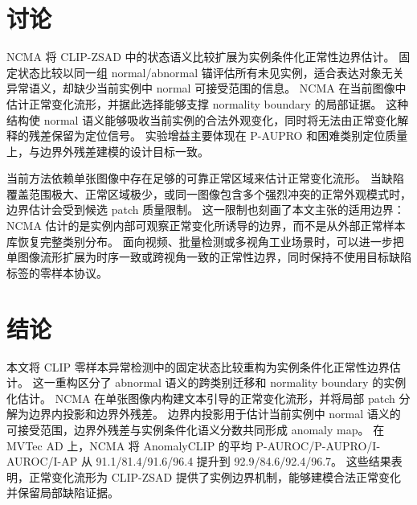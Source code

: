 \documentclass[UTF8,11pt,a4paper,fontset=none]{ctexart}
\newcommand{\method}{NCMA}
\begin{document}
\section{讨论}
\label{sec:discussion}

\method{} 将 CLIP-ZSAD 中的状态语义比较扩展为实例条件化正常性边界估计。
固定状态比较以同一组 normal/abnormal 锚评估所有未见实例，适合表达对象无关异常语义，却缺少当前实例中 normal 可接受范围的信息。
\method{} 在当前图像中估计正常变化流形，并据此选择能够支撑 normality boundary 的局部证据。
这种结构使 normal 语义能够吸收当前实例的合法外观变化，同时将无法由正常变化解释的残差保留为定位信号。
实验增益主要体现在 P-AUPRO 和困难类别定位质量上，与边界外残差建模的设计目标一致。

当前方法依赖单张图像中存在足够的可靠正常区域来估计正常变化流形。
当缺陷覆盖范围极大、正常区域极少，或同一图像包含多个强烈冲突的正常外观模式时，边界估计会受到候选 patch 质量限制。
这一限制也刻画了本文主张的适用边界：NCMA 估计的是实例内部可观察正常变化所诱导的边界，而不是从外部正常样本库恢复完整类别分布。
面向视频、批量检测或多视角工业场景时，可以进一步把单图像流形扩展为时序一致或跨视角一致的正常性边界，同时保持不使用目标缺陷标签的零样本协议。

\section{结论}
\label{sec:conclusion}

本文将 CLIP 零样本异常检测中的固定状态比较重构为实例条件化正常性边界估计。
这一重构区分了 abnormal 语义的跨类别迁移和 normality boundary 的实例化估计。
\method{} 在单张图像内构建文本引导的正常变化流形，并将局部 patch 分解为边界内投影和边界外残差。
边界内投影用于估计当前实例中 normal 语义的可接受范围，边界外残差与实例条件化语义分数共同形成 anomaly map。
在 MVTec AD 上，\method{} 将 AnomalyCLIP 的平均 P-AUROC/P-AUPRO/I-AUROC/I-AP 从 91.1/81.4/91.6/96.4 提升到 92.9/84.6/92.4/96.7。
这些结果表明，正常变化流形为 CLIP-ZSAD 提供了实例边界机制，能够建模合法正常变化并保留局部缺陷证据。
\end{document}
